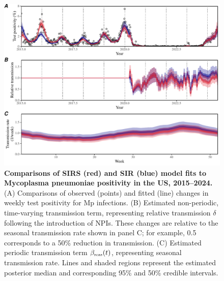 \documentclass[12pt]{article}
\newcommand{\tsub}[2]{#1_{{\textrm{\tiny #2}}}}
\begin{document}
\pagebreak

\begin{figure}[!ht]
\includegraphics[width=\textwidth]{../figure_sirs/figure_sirs_fit.pdf}
\caption{
\textbf{Comparisons of SIRS (red) and SIR (blue) model fits to Mycoplasma pneumoniae positivity in the US, 2015--2024.}
(A) Comparisons of observed (points) and fitted (line) changes in weekly test positivity for Mp infections.
(B) Estimated non-periodic, time-varying transmission term, representing relative transmission $\delta$ following the introduction of NPIs.
These changes are relative to the seasonal transmission rate shown in panel C;
for example, 0.5 corresponds to a 50\% reduction in transmission.
(C) Estimated periodic transmission term  $\tsub{\beta}{seas}(t)$, representing seasonal transmission rate.
Lines and shaded regions represent the estimated posterior median and corresponding 95\% and 50\% credible intervals.
}
\end{figure}

\pagebreak
\end{document}
